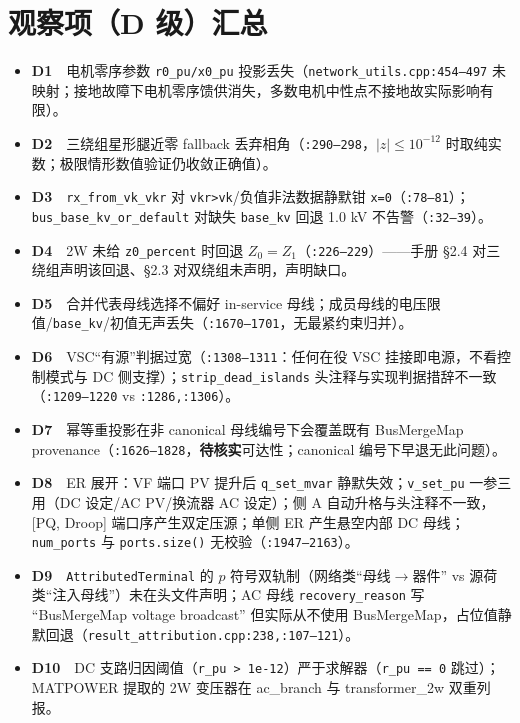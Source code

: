 \documentclass[11pt,a4paper,fontset=fandol]{ctexart}
\newcommand{\file}[1]{\texttt{#1}}
\begin{document}
\section{观察项（D 级）汇总}
\label{sec:obs}

\begin{itemize}
  \item \textbf{D1}　电机零序参数 \texttt{r0\_pu/x0\_pu} 投影丢失（\file{network\_utils.cpp:454--497} 未映射；接地故障下电机零序馈供消失，多数电机中性点不接地故实际影响有限）。
  \item \textbf{D2}　三绕组星形腿近零 fallback 丢弃相角（\file{:290--298}，$|z|\le10^{-12}$ 时取纯实数；极限情形数值验证仍收敛正确值）。
  \item \textbf{D3}　\file{rx\_from\_vk\_vkr} 对 \texttt{vkr>vk}/负值非法数据静默钳 \texttt{x=0}（\file{:78--81}）；\texttt{bus\_base\_kv\_or\_default} 对缺失 \texttt{base\_kv} 回退 1.0 kV 不告警（\file{:32--39}）。
  \item \textbf{D4}　2W 未给 \texttt{z0\_percent} 时回退 $Z_0=Z_1$（\file{:226--229}）——手册 \S 2.4 对三绕组声明该回退、\S 2.3 对双绕组未声明，声明缺口。
  \item \textbf{D5}　合并代表母线选择不偏好 in-service 母线；成员母线的电压限值/\texttt{base\_kv}/初值无声丢失（\file{:1670--1701}，无最紧约束归并）。
  \item \textbf{D6}　VSC``有源''判据过宽（\file{:1308--1311}：任何在役 VSC 挂接即电源，不看控制模式与 DC 侧支撑）；\file{strip\_dead\_islands} 头注释与实现判据措辞不一致（\file{:1209--1220} vs \file{:1286,:1306}）。
  \item \textbf{D7}　幂等重投影在非 canonical 母线编号下会覆盖既有 BusMergeMap provenance（\file{:1626--1828}，\textbf{待核实}可达性；canonical 编号下早退无此问题）。
  \item \textbf{D8}　ER 展开：VF 端口 PV 提升后 \texttt{q\_set\_mvar} 静默失效；\texttt{v\_set\_pu} 一参三用（DC 设定/AC PV/换流器 AC 设定）；侧 A 自动升格与头注释不一致，[PQ, Droop] 端口序产生双定压源；单侧 ER 产生悬空内部 DC 母线；\texttt{num\_ports} 与 \texttt{ports.size()} 无校验（\file{:1947--2163}）。
  \item \textbf{D9}　\texttt{AttributedTerminal} 的 $p$ 符号双轨制（网络类``母线$\to$器件'' vs 源荷类``注入母线''）未在头文件声明；AC 母线 \texttt{recovery\_reason} 写 ``BusMergeMap voltage broadcast'' 但实际从不使用 BusMergeMap，占位值静默回退（\file{result\_attribution.cpp:238,:107--121}）。
  \item \textbf{D10}　DC 支路归因阈值（\texttt{r\_pu > 1e-12}）严于求解器（\texttt{r\_pu == 0} 跳过）；MATPOWER 提取的 2W 变压器在 ac\_branch 与 transformer\_2w 双重列报。

\end{itemize}
\end{document}
